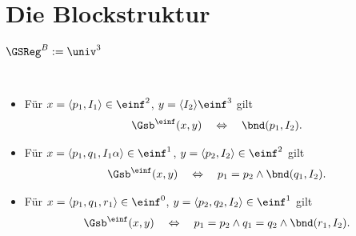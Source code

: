

\section{Die Blockstruktur}


\begin{dfn}[$\GSReg$]
    $\GSReg^B := \univ^3$
\end{dfn}


\begin{dfn}[$\Gsb^\einf$]\ 
    \begin{itemize}
        \item Für $x = \langle p_1, I_1 \rangle \in \einf^2$, $y = \langle I_2 \rangle \einf^3$ gilt
            \begin{align*}
                \Gsb^\einf(x,y) 
                \quad \Leftrightarrow \quad 
                \bnd(p_1,I_2).
            \end{align*}
        \item Für $x = \langle p_1,q_1,I_1 \alpha \rangle \in \einf^1$, $y = \langle p_2,I_2 \rangle \in \einf^2$ gilt
            \begin{align*}
                \Gsb^\einf(x,y) 
                \quad \Leftrightarrow \quad 
                p_1 = p_2 \land \bnd(q_1,I_2).
            \end{align*}
        \item Für $x = \langle p_1,q_1,r_1 \rangle \in \einf^0$, $y = \langle p_2,q_2,I_2 \rangle \in \einf^1$ gilt
            \begin{align*}
                \Gsb^\einf(x,y) 
                \quad \Leftrightarrow \quad 
                p_1 = p_2 \land q_1 = q_2 \land \bnd(r_1,I_2).
            \end{align*}
    \end{itemize}
\end{dfn}


